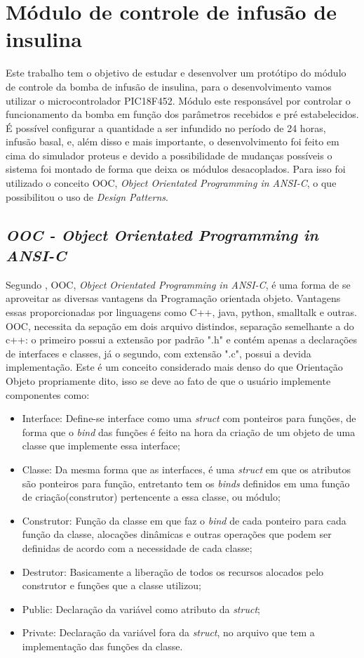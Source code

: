 \chapter{Módulo de controle de infusão de insulina}
Este trabalho tem o objetivo de estudar e desenvolver um protótipo do módulo de controle da bomba de infusão de insulina, para o desenvolvimento vamos utilizar o microcontrolador PIC18F452. Módulo este responsável por controlar o funcionamento da bomba em função dos parâmetros recebidos e pré estabelecidos. É possível configurar a quantidade a ser infundido no período de 24 horas, infusão basal, e, além disso e mais importante, o desenvolvimento foi feito em cima do simulador proteus e devido a possibilidade de mudanças possíveis o sistema foi montado de forma que deixa os módulos desacoplados. Para isso foi utilizado o conceito OOC, \emph{Object Orientated Programming in ANSI-C}, o que possibilitou o uso de \emph{Design Patterns}.

\section{\emph{OOC - \emph{Object Orientated Programming in ANSI-C}}}
Segundo \cite{schreiner1993object}, OOC, \emph{Object Orientated Programming in ANSI-C}, é uma forma de se aproveitar as diversas vantagens da Programação orientada objeto. Vantagens essas proporcionadas por linguagens como C++, java, python, smalltalk e outras. OOC, necessita da sepação em dois arquivo distindos, separação semelhante a do c++: o primeiro possui a extensão por padrão ".h" e contém apenas a declarações de interfaces e classes, já o segundo, com extensão ".c", possui a devida implementação. Este é um conceito considerado mais denso do que Orientação Objeto propriamente dito, isso se deve ao fato de que o usuário implemente componentes como: 

\begin{itemize}
\item Interface: Define-se interface como uma \emph{struct} com ponteiros para funções, de forma que o \emph{bind} das funções é feito na hora da criação de um objeto de uma classe que implemente essa interface;
\item Classe: Da mesma forma que as interfaces, é uma \emph{struct} em que os atributos são ponteiros para função, entretanto tem os \emph{binds} definidos em uma função de criação(construtor) pertencente a essa classe, ou módulo;
\item Construtor: Função da classe em que faz o \emph{bind} de cada ponteiro para cada função da classe, alocações dinâmicas e outras operações que podem ser definidas de acordo com a necessidade de cada classe;
\item Destrutor: Basicamente a liberação de todos os recursos alocados pelo construtor e funções que a classe utilizou;
\item Public: Declaração da variável como atributo da \emph{struct};
\item Private: Declaração da variável fora da \emph{struct}, no arquivo que tem a implementação das funções da classe.
\end{itemize}

